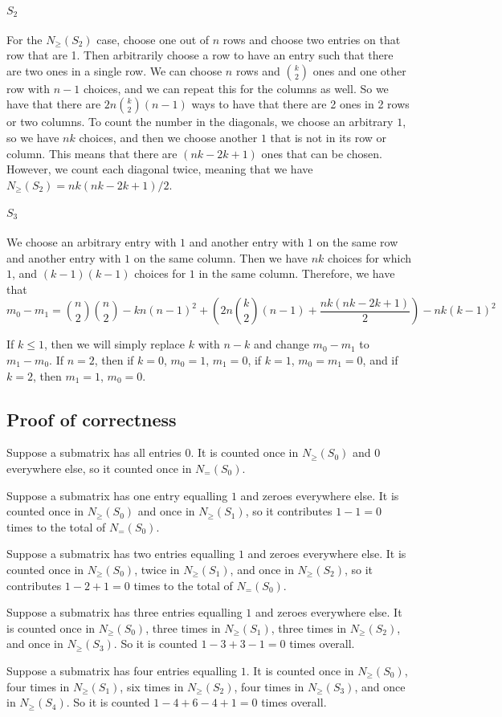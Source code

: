 \documentclass[]{article}
\begin{document}
\paragraph{$S_2$}
For the $N_{\geq}(S_2)$ case, choose one out of $n$ rows and choose two entries on that row that are 1. Then arbitrarily choose a row to have an entry such that there are two ones in a single row. We can choose $n$ rows and $\binom{k}{2}$ ones and one other row with $n-1$ choices, and we can repeat this for the columns as well. So we have that there are $2n \binom{k}{2}(n-1)$ ways to have that there are 2 ones in 2 rows or two columns. To count the number in the diagonals, we choose an arbitrary $1$, so we have $nk$ choices, and then we choose another $1$ that is not in its row or column. This means that there are $(nk - 2k + 1)$ ones that can be chosen. However, we count each diagonal twice, meaning that we have $N_{\geq}(S_2) = nk(nk - 2k + 1)/2$.
\paragraph{$S_3$}
We choose an arbitrary entry with $1$ and another entry with $1$ on the same row and another entry with $1$ on the same column. Then we have $nk$ choices for which $1$, and $(k-1)(k-1)$ choices for $1$ in the same column. Therefore, we have that 
\begin{equation}
	m_0 - m_1 = \binom{n}{2}\binom{n}{2} - kn(n-1)^2 + \left( 2n \binom{k}{2}(n-1) + \frac{nk(nk - 2k + 1)}{2} \right) - nk(k-1)^2
\end{equation}

If $k \leq 1$, then we will simply replace $k$ with $n - k$ and change $m_0 - m_1$ to $m_1 - m_0$. If $n = 2$, then if $k = 0$, $m_0 = 1$, $m_1 = 0$, if $k = 1$, $m_0 = m_1 = 0$, and if $k = 2$, then $m_1 = 1$, $m_0 = 0$.
\subsection{Proof of correctness}
Suppose a submatrix has all entries 0. It is counted once in $N_{\geq}(S_0)$ and 0 everywhere else, so it counted once in $N_{=}(S_0)$. 

Suppose a submatrix has one entry equalling $1$ and zeroes everywhere else. It is counted once in $N_{\geq}(S_0)$ and once in $N_{\geq}(S_1)$, so it contributes $1 - 1 = 0$ times to the total of $N_{=}(S_0)$. 

Suppose a submatrix has two entries equalling $1$ and zeroes everywhere else. It is counted once in $N_{\geq}(S_0)$, twice in $N_{\geq}(S_1)$, and once in $N_{\geq}(S_2)$, so it contributes $1 - 2 + 1 = 0$ times to the total of $N_{=}(S_0)$.

Suppose a submatrix has three entries equalling $1$ and zeroes everywhere else. It is counted once in $N_{\geq}(S_0)$, three times in $N_{\geq}(S_1)$, three times in $N_{\geq}(S_2)$, and once in $N_{\geq}(S_3)$. So it is counted $1 - 3 + 3 - 1 = 0$ times overall.

Suppose a submatrix has four entries equalling $1$. It is counted once in $N_{\geq}(S_0)$, four times in $N_{\geq}(S_1)$, six times in $N_{\geq}(S_2)$, four times in $N_{\geq}(S_3)$, and once in $N_{\geq}(S_4)$. So it is counted $1 - 4 + 6 - 4 + 1 = 0$ times overall.
\end{document}
